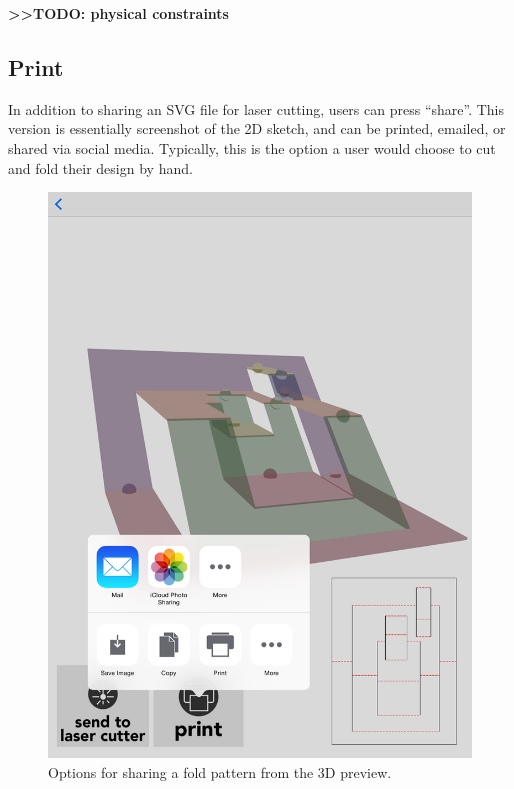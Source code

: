 \textbf{\textgreater{}\textgreater{}TODO: physical constraints}

\subsection{Print}\label{print}

In addition to sharing an SVG file for laser cutting, users can press
``share''. This version is essentially screenshot of the 2D sketch, and
can be printed, emailed, or shared via social media. Typically, this is
the option a user would choose to cut and fold their design by hand.

\begin{figure}[htbp]
\centering
\includegraphics{figures/32_UI_Tool_Interactions/3d-share.png}
\caption{Options for sharing a fold pattern from the 3D preview.}
\end{figure}
